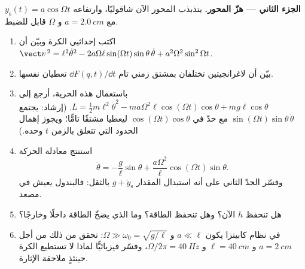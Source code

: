 \begin{problem}
\medskip\noindent\textbf{الجزء الثاني --- هزّ المحور.}
يتذبذب المحور الآن شاقوليًا، وارتفاعه $y_{\text{s}}(t) =
a\cos\Omega t$ مع $a = \qty{2.0}{cm}$ و $\Omega$ قابل للضبط.
\begin{enumerate}[resume]
  \item اكتب إحداثيي الكرة وبيّن أن
        $\vect v^{\,2} = \ell^2\dot\theta^2 -
        2a\Omega\ell\sin(\Omega t)\sin\theta\,\dot\theta +
        a^2\Omega^2\sin^2\Omega t$.
  \item بيّن أن لاغرانجيتين تختلفان بمشتق زمني تام
        $\dd F(q,t)/\dd t$ تعطيان  نفسها.
  \item باستعمال هذه الحرية، أرجع  إلى $L = \tfrac12 m
        \ell^2\dot\theta^2 - ma\Omega^2\ell\cos(\Omega t)\cos\theta +
        mg\ell\cos\theta$. (إرشاد: يجتمع $\sin(\Omega t)\sin\theta\,\dot\theta$
        مع حدّ في $\cos(\Omega t)\cos\theta$ ليعطيا مشتقًا تامًّا؛
        ويجوز إهمال الحدود التي تتعلق بالزمن $t$ وحده.)
  \item استنتج معادلة الحركة
        \[
        \ddot\theta = -\frac{g}{\ell}\sin\theta
         + \frac{a\Omega^2}{\ell}\cos(\Omega t)\sin\theta .
        \]
        وفسّر الحدّ الثاني على أنه استبدال المقدار $g +
        \ddot y_{\text{s}}$ بالثقل: فالبندول يعيش في مصعد.
  \item هل تنحفظ  $h$ الآن؟ وهل تنحفظ الطاقة؟ وما الذي
        يضخّ الطاقة داخلًا وخارجًا؟
  \item في نظام كابيتزا يكون $a \ll \ell$ و $\Omega \gg \omega_0 =
        \sqrt{g/\ell}$: تحقق من ذلك من أجل $a = \qty{2}{cm}$ و $\ell =
        \qty{40}{cm}$ و $\Omega/2\pi = \qty{40}{Hz}$، وفسّر فيزيائيًّا
        لماذا لا تستطيع الكرة حينئذٍ ملاحقة الإثارة.
\end{enumerate}


\end{problem}
